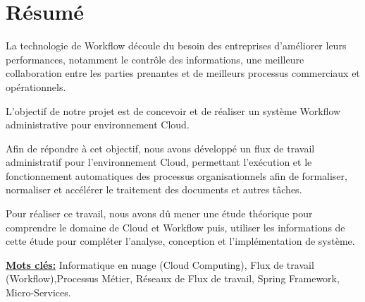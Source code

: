 \chapter*{Résumé}

\large

La technologie de Workflow découle du besoin des entreprises d’améliorer leurs performances, notamment le contrôle des informations, une meilleure collaboration entre les parties prenantes et de meilleurs processus commerciaux et opérationnels.

L'objectif de notre projet est de concevoir et de réaliser un système Workflow administrative  pour environnement Cloud.
 

Afin de répondre à cet objectif,  nous avons développé un flux de travail administratif pour l'environnement Cloud, permettant l'exécution et le fonctionnement automatiques des processus organisationnels afin de formaliser, normaliser et accélérer le traitement des documents et autres tâches.

Pour réaliser ce travail, nous avons dû mener une étude théorique pour comprendre le domaine de Cloud  et Workflow  puis, utiliser les informations de cette étude pour compléter l'analyse, conception et l'implémentation de système.



\textbf{\underline{Mots clés:}}   Informatique en nuage (Cloud Computing), Flux de travail (Workflow),Processus Métier, Réseaux de Flux de travail, Spring Framework, Micro-Services. 


\normalsize


